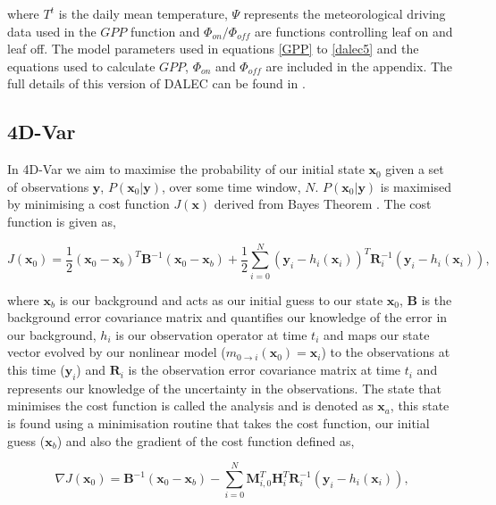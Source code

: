 \documentclass[11pt]{article}
\begin{document}
where $T^{t}$ is the daily mean temperature, $\Psi$ represents the meteorological driving data used in the $GPP$ function and $\Phi_{on} / \Phi_{off}$ are functions controlling leaf on and leaf off. The model parameters used in equations \ref{GPP} to \ref{dalec5} and the equations used to calculate $GPP$, $\Phi_{on}$ and $\Phi_{off}$ are included in the appendix. The full details of this version of DALEC can be found in \cite{Bloom2014}.

\subsection{4D-Var}

In 4D-Var we aim to maximise the probability of our initial state $\textbf{x}_0$ given a set of observations $\textbf{y}$, $P(\textbf{x}_0|\textbf{y})$, over some time window, $N$. $P(\textbf{x}_0|\textbf{y})$ is maximised by minimising a cost function $J(\textbf{x})$ derived from Bayes Theorem \citep{lewis2006dynamic}. The cost function is given as,

\begin{equation}
J(\textbf{x}_0) = \frac{1}{2}(\textbf{x}_0-\textbf{x}_b)^{T}\textbf{B}^{-1}(\textbf{x}_0-\textbf{x}_b)+\frac{1}{2}\sum_{i=0}^{N}(\textbf{y}_i-h_i(\textbf{x}_i))^{T}\textbf{R}_{i}^{-1}(\textbf{y}_i-h_i(\textbf{x}_i)),
\end{equation}

where $\textbf{x}_b$ is our background and acts as our initial guess to our state $\textbf{x}_0$, $\textbf{B}$ is the background error covariance matrix and quantifies our knowledge of the error in our background, $h_i$ is our observation operator at time $t_i$ and maps our state vector evolved by our nonlinear model ($m_{0\rightarrow i}(\mathbf{x}_{0})=\textbf{x}_i$) to the observations at this time ($\textbf{y}_i$) and $\textbf{R}_i$ is the observation error covariance matrix at time $t_i$ and represents our knowledge of the uncertainty in the observations. The state that minimises the cost function is called the analysis and is denoted as $\textbf{x}_a$, this state is found using a minimisation routine that takes the cost function, our initial guess ($\textbf{x}_b$) and also the gradient of the cost function defined as,

\begin{equation}
\nabla J(\textbf{x}_0) = \textbf{B}^{-1}(\textbf{x}_0-\textbf{x}_b)-\sum_{i=0}^{N}\textbf{M}_{i,0}^{T}\textbf{H}_i^{T}\textbf{R}_{i}^{-1}(\textbf{y}_i-h_i(\textbf{x}_i)),
\end{equation}
\end{document}
